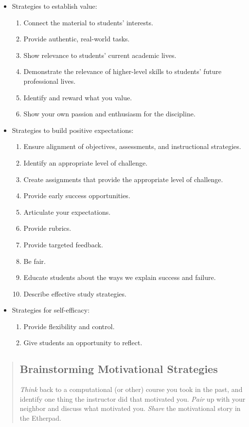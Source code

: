 \begin{itemize}
\item Strategies to establish value:


\begin{enumerate}
\item Connect the material to students' interests.
\item Provide authentic, real-world tasks.
\item Show relevance to students' current academic lives.
\item Demonstrate the relevance of higher-level skills to students' future professional lives.
\item Identify and reward what you value.
\item Show your own passion and enthusiasm for the discipline.
\end{enumerate}
\item Strategies to build positive expectations:


\begin{enumerate}
\item Ensure alignment of objectives, assessments, and instructional strategies.
\item Identify an appropriate level of challenge.
\item Create assignments that provide the appropriate level of challenge.
\item Provide early success opportunities.
\item Articulate your expectations.
\item Provide rubrics.
\item Provide targeted feedback.
\item Be fair.
\item Educate students about the ways we explain success and failure.
\item Describe effective study strategies.
\end{enumerate}
\item Strategies for self-efficacy:


\begin{enumerate}
\item Provide flexibility and control.
\item Give students an opportunity to reflect.
\end{enumerate}
\end{itemize}

\begin{quotation}   %
\subsection*{Brainstorming Motivational Strategies}

\emph{Think} back to a computational (or other) course you took in the past, and
identify one thing the instructor did that motivated you.
\emph{Pair} up with your neighbor and discuss what motivated you.
\emph{Share} the motivational story in the Etherpad.
\end{quotation}   %

